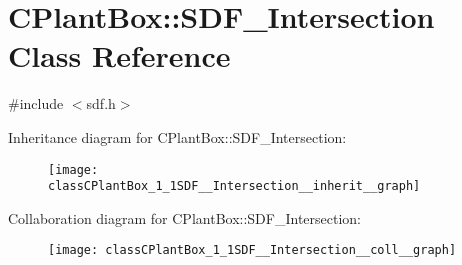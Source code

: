 \hypertarget{classCPlantBox_1_1SDF__Intersection}{}\section{C\+Plant\+Box\+:\+:S\+D\+F\+\_\+\+Intersection Class Reference}
\label{classCPlantBox_1_1SDF__Intersection}


{\ttfamily \#include $<$sdf.\+h$>$}



Inheritance diagram for C\+Plant\+Box\+:\+:S\+D\+F\+\_\+\+Intersection\+:\nopagebreak
\begin{figure}[H]
\begin{center}
\leavevmode
\texttt{[image: classCPlantBox\_1\_1SDF\_\_Intersection\_\_inherit\_\_graph]}
\end{center}
\end{figure}


Collaboration diagram for C\+Plant\+Box\+:\+:S\+D\+F\+\_\+\+Intersection\+:\nopagebreak
\begin{figure}[H]
\begin{center}
\leavevmode
\texttt{[image: classCPlantBox\_1\_1SDF\_\_Intersection\_\_coll\_\_graph]}
\end{center}
\end{figure}
